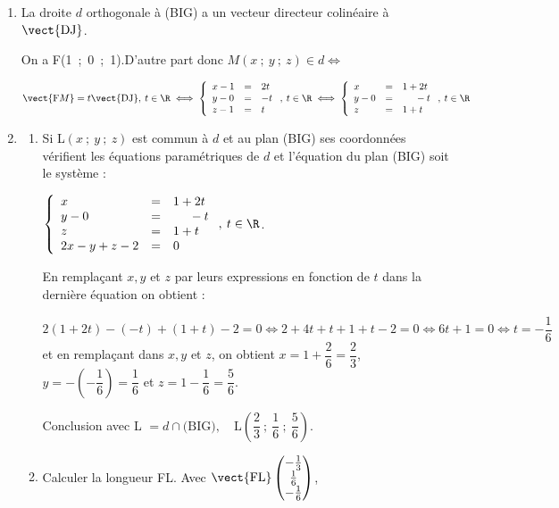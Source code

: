 \begin{enumerate}
Or B(1~;~0~;~0)$ \in  (\text{BIG}) \iff 2\times 1 - 1 \times 0 + 1 \times 0 + d = 0 \iff 2 + d = 0 \iff d = - 2$.

On a donc $M(x~;~y~;~z) \in (\text{BIG}) \iff 2x - 1y + 1z - 2 = 0$
\item 
La droite $d$ orthogonale à (BIG) a un vecteur directeur colinéaire à $\vect{\text{DJ}}$.

On a F(1~;~0~;~1).D'autre part donc $M(x~;~y~;~z) \in d \iff$

$ \vect{\text{F}M}  = t \vect{\text{DJ}}, \: t \in \R \iff \left\{\begin{array}{l c l}
x - 1&=&2t\\
y - 0&=&- t\\
z- 1&=&t
\end{array}\right., \:t \in \R \iff \left\{\begin{array}{l c l}
x &=&1 + 2t\\
y - 0&=&\phantom{1 + }- t\\
z&=&1 + t
\end{array}\right., \:t \in \R$

\item
	\begin{enumerate}
		\item 
Si L$(x~;~y~;~z)$ est commun à $d$ et au plan (BIG) ses coordonnées vérifient les équations paramétriques de $d$ et l'équation du plan (BIG) soit le système :
		
$\left\{\begin{array}{l c l}
x &=&1 + 2t\\
y - 0&=&\phantom{1 + }- t\\
z&=&1 + t\\
2x - y + z - 2&=&0
\end{array}\right., \:t \in \R$.

En remplaçant $x, y$ et $z$ par leurs expressions en fonction de $t$ dans la dernière équation on obtient :

$2(1 + 2t) - (- t) + (1 + t) - 2 = 0 \iff 2 + 4t + t + 1 + t - 2 = 0\iff 6t + 1 = 0\iff t = - \dfrac16$ et en remplaçant dans $x, y$ et $z$, on obtient $x = 1 + \dfrac26 = \dfrac23$,\:$y = -\left(- \dfrac16 \right) = \dfrac16$ et $z = 1 - \dfrac16  = \dfrac56$.

Conclusion avec L $ = d \cap \text{(BIG)},\quad  \text{L}\left(\dfrac23~;~\dfrac16~;~\dfrac56\right)$.
		

		\item Calculer la longueur FL.
Avec $\vect{\text{FL}}\begin{pmatrix} -\frac13\\\frac16\\- \frac16 \end{pmatrix}$, 


\end{enumerate}
\end{enumerate}
